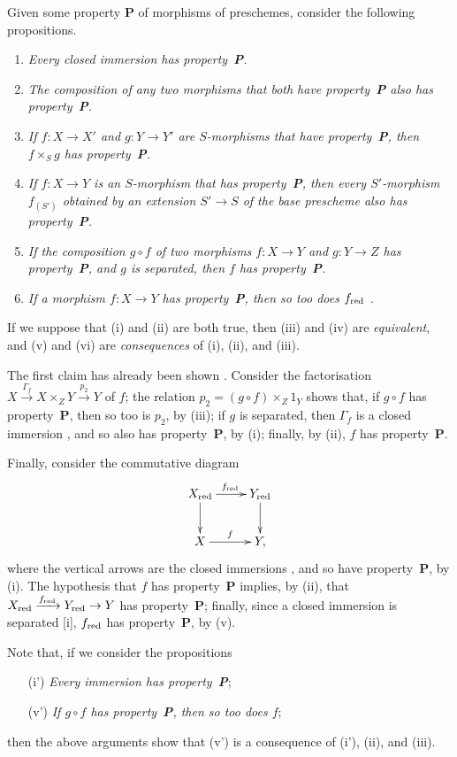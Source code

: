 \begin{rmk}[5.5.12]
\label{1.5.5.12}
Given some property \textbf{P} of morphisms of preschemes, consider the following propositions.
\begin{enumerate}[label=(\roman*)]
    \item \emph{Every closed immersion has property~\textbf{P}.}
    \item \emph{The composition of any two morphisms that both have property~\textbf{P} also has property~\textbf{P}.}
    \item \emph{If $f:X\to X'$ and $g:Y\to Y'$ are $S$-morphisms that have property~\textbf{P}, then $f\times_S g$ has property~\textbf{P}.}
    \item \emph{If $f:X\to Y$ is an $S$-morphism that has property~\textbf{P}, then every $S'$-morphism $f_{(S')}$ obtained by an extension $S'\to S$ of the base prescheme also has property~\textbf{P}.}
    \item \emph{If the composition $g\circ f$ of two morphisms $f:X\to Y$ and $g:Y\to Z$ has property~\textbf{P}, and $g$ is separated, then $f$ has property~\textbf{P}.}
    \item \emph{If a morphism $f:X\to Y$ has property~\textbf{P}, then so too does $f_{\mathrm{red}}$ .}
\end{enumerate}
If we suppose that (i) and (ii) are both true, then (iii) and (iv) are \emph{equivalent}, and (v) and (vi) are \emph{consequences} of (i), (ii), and (iii).

The first claim has already been shown .
Consider the factorisation  $X\xrightarrow{\Gamma_f}X\times_Z Y\xrightarrow{p_2}Y$ of $f$;
the relation $p_2=(g\circ f)\times_Z 1_Y$ shows that, if $g\circ f$ has property~\textbf{P}, then so too is $p_2$, by (iii);
if $g$ is separated, then $\Gamma_f$ is a closed immersion , and so also has property~\textbf{P}, by (i);
finally, by (ii), $f$ has property~\textbf{P}.

Finally, consider the commutative diagram
\[
  \xymatrix{
    X_\red\ar[r]^{f_\red}\ar[d] &
    Y_\red\ar[d]\\
    X\ar[r]^f &
    Y,
  }
\]
where the vertical arrows are the closed immersions , and so have property~\textbf{P}, by (i).
The hypothesis that $f$ has property~\textbf{P} implies, by (ii), that $X_\red\xrightarrow{f_\red}Y_\red\to Y$ has property~\textbf{P};
finally, since a closed immersion is separated [i], $f_{\mathrm{red}}$ has property~\textbf{P}, by (v).

Note that, if we consider the propositions
\begin{enumerate}
  \item[(i')] \emph{Every immersion has property~\textbf{P}};
  \item[(v')] \emph{If $g\circ f$ has property~\textbf{P}, then so too does $f$};
\end{enumerate}
then the above arguments show that (v') is a consequence of (i'), (ii), and (iii).
\end{rmk}

